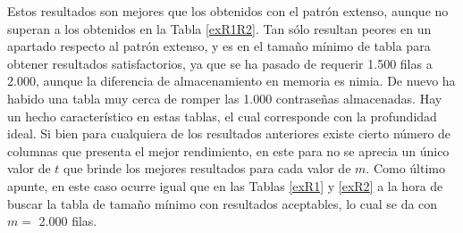 \documentclass[12pt,spanish,listoffigures,listoftables,listofalgorithms]{tfgetsinf}
\begin{document}
\def\arraystretch{1.5}
\begin{table}[H]
	\centering
	\caption{Porcentajes de éxito para las tablas que emplean patrón reducido}
	\label{expp}
\end{table}

Estos resultados son mejores que los obtenidos con el patrón extenso, aunque no superan a los obtenidos en la Tabla \ref{exR1R2}. Tan sólo resultan peores en un apartado respecto al patrón extenso, y es en el tamaño mínimo de tabla para obtener resultados satisfactorios, ya que se ha pasado de requerir 1.500 filas a 2.000, aunque la diferencia de almacenamiento en memoria es nimia. De nuevo ha habido una tabla muy cerca de romper las 1.000 contraseñas almacenadas. Hay un hecho característico en estas tablas, el cual corresponde con la profundidad ideal. Si bien para cualquiera de los resultados anteriores existe cierto número de columnas que presenta el mejor rendimiento, en este para no se aprecia un único valor de $t$ que brinde los mejores resultados para cada valor de $m$. Como último apunte, en este caso ocurre igual que en las Tablas \ref{exR1} y \ref{exR2} a la hora de buscar la tabla de tamaño mínimo con resultados aceptables, lo cual se da con $m =$ 2.000 filas.
\end{document}

